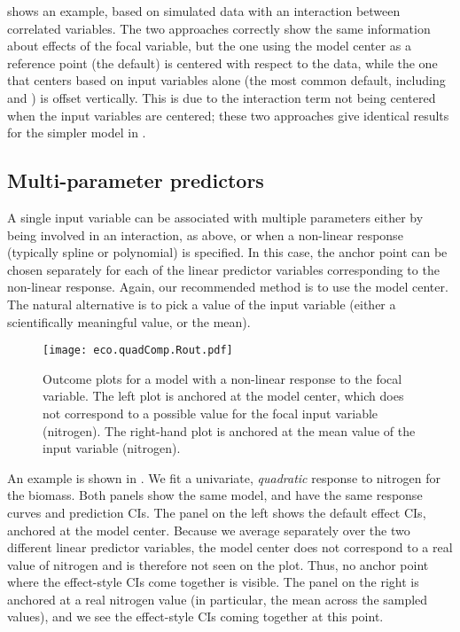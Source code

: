  shows an example, based on simulated data with an interaction between correlated variables. The two approaches correctly show the same information about effects of the focal variable, but the one using the model center as a reference point (the  default) is centered with respect to the data, while the one that centers based on input variables alone (the most common default, including  and ) is offset vertically. This is due to the interaction term not being centered when the input variables are centered; these two approaches give identical results for the simpler model in .

\subsection{Multi-parameter predictors}

A single input variable can be associated with multiple parameters either by being involved in an interaction, as above, or when a non-linear response (typically spline or polynomial) is specified. In this case, the anchor point can be chosen separately for each of the linear predictor variables corresponding to the non-linear response. Again, our recommended method is to use the model center. The natural alternative is to pick a value of the input variable (either a scientifically meaningful value, or the mean).

\begin{figure}
\begin{center}
\texttt{[image: eco.quadComp.Rout.pdf]}
\end{center}
\caption{Outcome plots for a model with a non-linear response to the focal variable. The left plot is anchored at the model center, which does not correspond to a possible value for the focal input variable (nitrogen). The right-hand plot is anchored at the mean value of the input variable (nitrogen). }
\end{figure}

An example is shown in . We fit a univariate, \emph{quadratic} response to nitrogen for the biomass. Both panels show the same model, and have the same response curves and prediction CIs. The panel on the left shows the default effect CIs, anchored at the model center.
Because we average separately over the two different linear predictor variables, 
the model center does not correspond to a real value of nitrogen and is therefore not seen on the plot. 
Thus, no anchor point where the effect-style CIs come together is visible. 
The panel on the right is anchored at a real nitrogen value (in particular, the mean across the sampled values), and we see the effect-style CIs coming together at this point.

